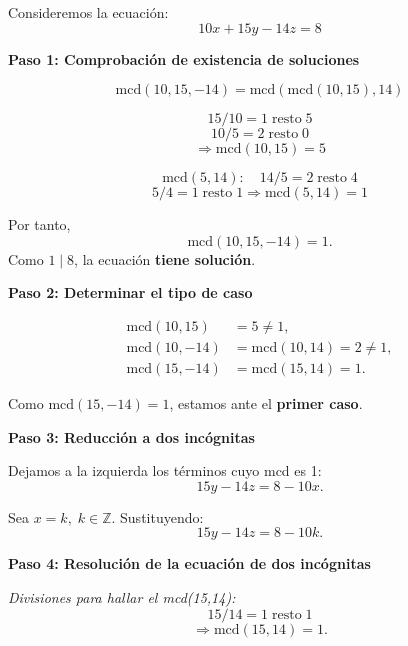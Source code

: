 \documentclass[a4paper,12pt]{article}
\begin{document}
\begin{ejemplo}[title={Ecuación diofántica con 3 incógnitas (Primer caso)}]
Consideremos la ecuación:
\[
10x + 15y - 14z = 8
\]

\textbf{Paso 1: Comprobación de existencia de soluciones}

\[
\text{mcd}(10,15,-14) = \text{mcd}(\text{mcd}(10,15),14)
\]

\[
15 / 10 = 1 \;\text{resto}\; \boxed{5}
\]
\[
10 / 5 = 2 \;\text{resto}\; 0
\]
\[
\Rightarrow \text{mcd}(10,15) = 5
\]

\[
\text{mcd}(5,14): \quad 14 / 5 = 2 \;\text{resto}\; 4
\]
\[
5 / 4 = 1 \;\text{resto}\; \boxed{1}
\Rightarrow \text{mcd}(5,14) = 1
\]

Por tanto, 
\[
\text{mcd}(10,15,-14) = 1.
\]
Como \(1 \mid 8\), la ecuación \textbf{tiene solución}.

\bigskip

\textbf{Paso 2: Determinar el tipo de caso}

\[
\begin{aligned}
\text{mcd}(10,15) &= 5 \neq 1, \\
\text{mcd}(10,-14) &= \text{mcd}(10,14) = 2 \neq 1, \\
\text{mcd}(15,-14) &= \text{mcd}(15,14) = 1.
\end{aligned}
\]

Como \(\text{mcd}(15,-14)=1\), estamos ante el \textbf{primer caso}.

\bigskip

\textbf{Paso 3: Reducción a dos incógnitas}

Dejamos a la izquierda los términos cuyo mcd es 1:
\[
15y - 14z = 8 - 10x.
\]

Sea \(x = k, \; k \in \mathbb{Z}\). Sustituyendo:
\[
15y - 14z = 8 - 10k.
\]

\bigskip

\textbf{Paso 4: Resolución de la ecuación de dos incógnitas}

\textit{Divisiones para hallar el mcd(15,14):}
\[
15 / 14 = 1 \;\text{resto}\; \boxed{1}
\]
\[
\Rightarrow \text{mcd}(15,14) = 1.
\]

\end{ejemplo}
\end{document}
